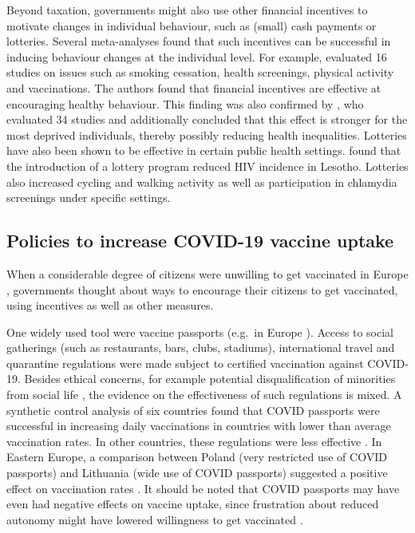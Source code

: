 \documentclass{scrbook}
\begin{document}
Beyond taxation, governments might also use other financial incentives
to motivate changes in individual behaviour, such as (small) cash
payments or lotteries. Several meta-analyses found that such incentives
can be successful in inducing behaviour changes at the individual level.
For example, \textcite{giles_effectiveness_2014} evaluated 16 studies on
issues such as smoking cessation, health screenings, physical activity
and vaccinations. The authors found that financial incentives are
effective at encouraging healthy behaviour. This finding was also
confirmed by \textcite{mantzari_personal_2015}, who evaluated 34 studies
and additionally concluded that this effect is stronger for the most
deprived individuals, thereby possibly reducing health inequalities.
Lotteries have also been shown to be effective in certain public health
settings. \textcite{bjorkman_nyqvist_incentivizing_2018} found that the
introduction of a lottery program reduced HIV incidence in Lesotho.
Lotteries also increased cycling \parencite{ciccone_using_2021} and
walking activity \parencite{patel_randomized_2018} as well as
participation in chlamydia screenings \parencite{niza_vouchers_2014}
under specific settings.

\subsection*{Policies to increase COVID-19 vaccine uptake}

When a considerable degree of citizens were unwilling to get vaccinated
in Europe \parencite{steinert_covid-19_2022}, governments thought about
ways to encourage their citizens to get vaccinated, using incentives as
well as other measures.

One widely used tool were vaccine passports (e.g.~in Europe
\parencite{niestadt_domestic_2021}). Access to social gatherings (such
as restaurants, bars, clubs, stadiums), international travel and
quarantine regulations were made subject to certified vaccination
against COVID-19. Besides ethical concerns, for example potential
disqualification of minorities from social life
\parencite{gostin_digital_2021}, the evidence on the effectiveness of
such regulations is mixed. A synthetic control analysis of six countries
found that COVID passports were successful in increasing daily
vaccinations in countries with lower than average vaccination rates. In
other countries, these regulations were less effective
\parencite{mills_effect_2022}. In Eastern Europe, a comparison between
Poland (very restricted use of COVID passports) and Lithuania (wide use
of COVID passports) suggested a positive effect on vaccination rates
\parencite{walkowiak_covid-19_2021}. It should be noted that COVID
passports may have even had negative effects on vaccine uptake, since
frustration about reduced autonomy might have lowered willingness to get
vaccinated \parencite{porat_vaccine_2021}.
\end{document}
